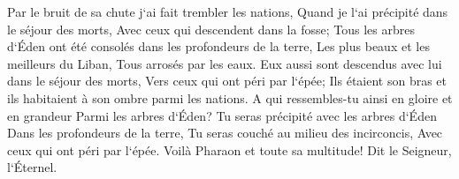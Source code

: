 \verse Par le bruit de sa chute j`ai fait trembler les nations, Quand je l`ai précipité dans le séjour des morts, Avec ceux qui descendent dans la fosse; Tous les arbres d`Éden ont été consolés dans les profondeurs de la terre, Les plus beaux et les meilleurs du Liban, Tous arrosés par les eaux. 
\verse Eux aussi sont descendus avec lui dans le séjour des morts, Vers ceux qui ont péri par l`épée; Ils étaient son bras et ils habitaient à son ombre parmi les nations. 
\verse A qui ressembles-tu ainsi en gloire et en grandeur Parmi les arbres d`Éden? Tu seras précipité avec les arbres d`Éden Dans les profondeurs de la terre, Tu seras couché au milieu des incirconcis, Avec ceux qui ont péri par l`épée. Voilà Pharaon et toute sa multitude! Dit le Seigneur, l`Éternel. 

\chapter{}

